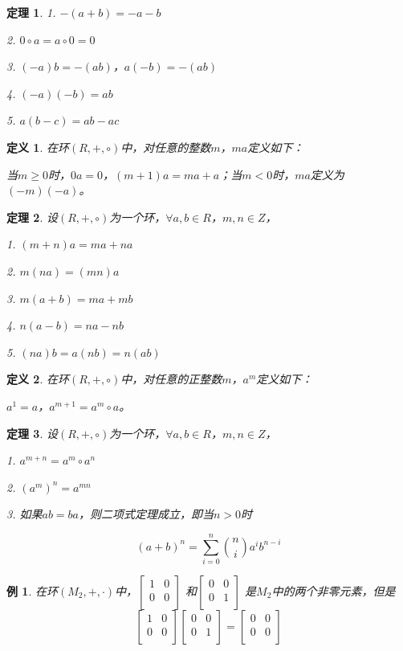 \documentclass{article}
\newtheorem{Def}{定义}
\newtheorem{Thm}{定理}
\newtheorem*{Example}{例}
\begin{document}
\begin{CJK*}{UTF8}{gbsn}
\begin{Thm}
  1. $-(a+b)=-a-b$

  2. $0\circ a = a\circ 0 = 0$

  3. $(-a)b = -(ab)$，$a(-b)=-(ab)$

  4. $(-a)(-b)=ab$

  5. $a(b-c)=ab-ac$

\end{Thm}

\begin{Def}
  在环$(R,+,\circ)$中，对任意的整数$m$，$ma$定义如下：

  当$m\geq 0$时，$0a=0$，$(m+1)a=ma+a$；当$m<0$时，$ma$定义为$(-m)(-a)$。
\end{Def}

\begin{Thm}
  设$(R,+,\circ)$为一个环，$\forall a,b \in R$，$m, n \in Z$，

  1. $(m+n)a=ma + na$

  2. $m(na)=(mn)a$

  3. $m(a+b) = ma + mb$

  4. $n(a-b) = na - nb$

  5. $(na)b=a(nb)=n(ab)$
\end{Thm}

\begin{Def}
  在环$(R,+,\circ)$中，对任意的正整数$m$，$a^m$定义如下：

  $a^1=a$，$a^{m+1}=a^m\circ a$。
\end{Def}

\begin{Thm}
  设$(R,+,\circ)$为一个环，$\forall a,b \in R$，$m, n \in Z$，

  1. $a^{m+n}=a^m \circ a^n$

  2. $(a^{m})^n=a^{mn}$

  3. 如果$ab=ba$，则二项式定理成立，即当$n>0$时

  \[(a+b)^n=\sum_{i=0}^{n}\binom{n}{i}a^ib^{n-i}\]
\end{Thm}

\begin{Example}
  在环$(M_2,+,\cdot)$中，$\begin{bmatrix}
    1&0\\
    0&0\\
  \end{bmatrix}$
  和$\begin{bmatrix}
    0&0\\
    0&1\\
  \end{bmatrix}$
  是$M_2$中的两个非零元素，但是\[\begin{bmatrix}
    1&0\\
    0&0\\
  \end{bmatrix}\begin{bmatrix}
    0&0\\
    0&1\\
  \end{bmatrix}=\begin{bmatrix}
    0&0\\
    0&0\\
  \end{bmatrix}\]
\end{Example}


\end{CJK*}
\end{document}
